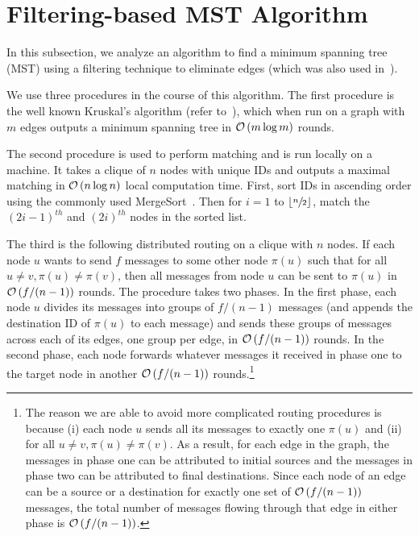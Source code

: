 \section{Filtering-based MST Algorithm}\label{sec:kmachine-filtering-mst}
In this subsection, we analyze an algorithm to find a minimum spanning tree (MST) using a filtering technique to eliminate edges   (which was also used  in~\cite{LMSV11}). 

We use three procedures in the course of this algorithm. The first procedure is the well known Kruskal's algorithm  (refer to~\cite{CLRS09}), which when run on a graph with $m$ edges outputs a minimum spanning tree in $\mathcal{O}\left(m\log{m}\right)$ rounds. 

The second procedure is used to perform matching and is run locally on a machine. It takes a clique of $n$ nodes with unique IDs and outputs a maximal matching in $\mathcal{O}\left(n\log{n}\right)$ local computation time. First, sort IDs in ascending order using the commonly used MergeSort~\cite{CLRS09}. Then for $i=1$ to $\left\lfloor\sfrac{n}{2}\right\rfloor$, match the $(2i -1)^{th}$ and $(2i)^{th}$ nodes in the sorted list.

The third is the following distributed routing on a clique with $n$ nodes. If each node $u$ wants to send $f$ messages to some other node $\pi(u)$ such that for all $u \neq v, \pi(u) \neq \pi(v)$, then all messages from node $u$ can be sent to $\pi(u)$ in $\mathcal{O}\left(f/(n-1)\right)$ rounds. The procedure takes two phases. In the first phase, each node $u$ divides its messages into groups of $f/(n-1)$ messages (and appends the destination ID of $\pi(u)$ to each message) and sends these groups of messages across each of its edges, one group per edge, in $\mathcal{O}\left(f/(n-1)\right)$ rounds. In the second phase, each node forwards whatever messages it received in phase one to the target node in another $\mathcal{O}\left(f/(n-1)\right)$ rounds.\footnote{The reason we are able to avoid more complicated routing procedures is because (i) each node $u$ sends all its messages to exactly one $\pi(u)$ and (ii) for all $u \neq v, \pi(u) \neq \pi(v)$. As a result, for each edge in the graph, the messages in phase one can be attributed to initial sources and the messages in phase two can be attributed to final destinations. Since each node of an edge can be a source or a destination for exactly one set of $\mathcal{O}\left(f/(n-1)\right)$ messages, the total number of messages flowing through that edge in either phase is $\mathcal{O}\left(f/(n-1)\right)$.}

